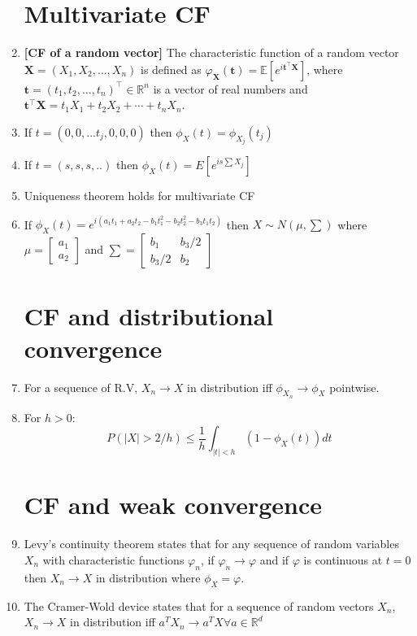 \documentclass[12pt,oneside]{book}
\begin{document}
\begin{enumerate}
\section{Multivariate CF}
\item \textbf{[CF of  a random vector]} The characteristic function of a random vector $\mathbf{X}=(X_1,X_2,\ldots,X_n)$ is defined as $\varphi_{\mathbf{X}}(\mathbf{t})=\mathbb{E}\left[e^{i\mathbf{t}^{\top}\mathbf{X}}\right]$, where $\mathbf{t}=(t_1,t_2,\ldots,t_n)^{\top}\in\mathbb{R}^n$ is a vector of real numbers and $\mathbf{t}^{\top}\mathbf{X}=t_1X_1+t_2X_2+\cdots+t_nX_n$.
\item If $t=(0,0,...t_j,0,0,0)$ then $\phi_X(t)=\phi_{X_j}(t_j)$
\item If $t=(s,s,s,..)$ then $\phi_X(t)=E[e^{is\sum X_j}]$
\item Uniqueness theorem holds for multivariate CF
\item If $\phi_X(t)=e^{i(a_1t_1+a_2t_2-b_1t_1^2-b_2t_2^2-b_3t_1t_2)}$ then $X\sim N(\mu,\sum)$ where $\mu=\begin{bmatrix}
    a_1\\a_2
\end{bmatrix}$ and $\sum=\begin{bmatrix}
    b_1&b_3/2\\
    b_3/2&b_2
\end{bmatrix}$

\section{CF and distributional convergence}
\item For a sequence of R.V, $X_n\to X$ in distribution iff $\phi_{X_n}\to\phi_X$ pointwise.
\item For $h>0$:
$$P(|X|>2/h)\leq \frac{1}{h}\int_{|t|<h}(1-\phi_X(t))dt$$


\section{CF and weak convergence}




\item Levy's continuity theorem states that for any sequence of random variables $X_n$ with characteristic functions $\varphi_n$, if $\varphi_n\to\varphi$ and if $\varphi$ is continuous at $t=0$ then $X_n\to X$ in distribution where $\phi_X=\varphi$.
\item The Cramer-Wold device states that for a sequence of random vectors $X_n$, $X_n\to X$ in distribution iff $a^TX_n\to a^TX\forall a\in\mathbb R^d$


\end{enumerate}
\end{document}
